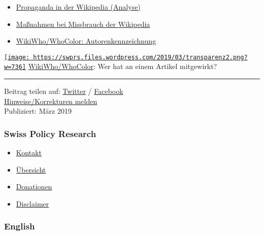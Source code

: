 \begin{itemize}
\tightlist
\item
  \href{https://swprs.org/propaganda-in-der-wikipedia/}{Propaganda in
  der Wikipedia (Analyse)}
\item
  \href{https://swprs.org/wikipedia-missbrauch-massnahmen/}{Maßnahmen
  bei Missbrauch der Wikipedia}
\item
  \href{https://f-squared.org/whovisual/}{WikiWho/WhoColor:
  Autorenkennzeichnung}
\end{itemize}

\href{https://swprs.files.wordpress.com/2019/03/transparenz2.png}{\texttt{[image: https://swprs.files.wordpress.com/2019/03/transparenz2.png?w=736]}}
\href{https://f-squared.org/whovisual/}{WikiWho/WhoColor}: Wer hat an
einem Artikel mitgewirkt?

\begin{center}\rule{0.5\linewidth}{\linethickness}\end{center}

Beitrag teilen auf:
\href{https://twitter.com/intent/tweet?url=https://swprs.org/wikipedia-manipulation-autoren/}{Twitter}
/
\href{https://www.facebook.com/share.php?u=https://swprs.org/wikipedia-manipulation-autoren/}{Facebook}\\
\href{https://swprs.org/kontakt/}{Hinweise/Korrekturen melden}\\
Publiziert: März 2019

\hypertarget{swiss-policy-research}{%
\subsubsection{Swiss Policy Research}\label{swiss-policy-research}}

\begin{itemize}
\tightlist
\item
  \href{https://swprs.org/kontakt/}{Kontakt}
\item
  \href{https://swprs.org/uebersicht/}{Übersicht}
\item
  \href{https://swprs.org/donationen/}{Donationen}
\item
  \href{https://swprs.org/disclaimer/}{Disclaimer}
\end{itemize}

\hypertarget{english}{%
\subsubsection{English}\label{english}}

